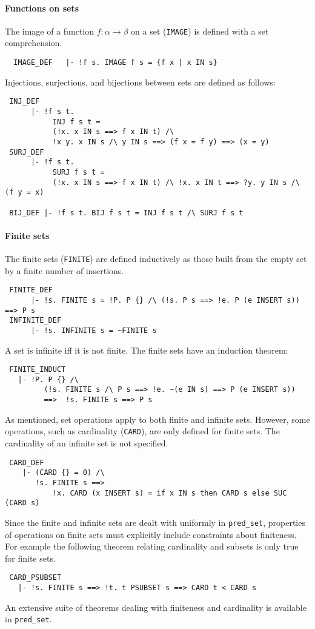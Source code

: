 \paragraph{Functions on sets}
The image of a function $f :\alpha \to \beta$ on
a set ({\small\verb+IMAGE+}) is defined with a set comprehension.
{\small
\begin{verbatim}
  IMAGE_DEF   |- !f s. IMAGE f s = {f x | x IN s}
\end{verbatim}
}
%
Injections, surjections, and bijections between sets are defined
as follows:
%
{\small
\begin{verbatim}
 INJ_DEF
      |- !f s t.
           INJ f s t =
           (!x. x IN s ==> f x IN t) /\
           !x y. x IN s /\ y IN s ==> (f x = f y) ==> (x = y)
 SURJ_DEF
      |- !f s t.
           SURJ f s t =
           (!x. x IN s ==> f x IN t) /\ !x. x IN t ==> ?y. y IN s /\ (f y = x)

 BIJ_DEF |- !f s t. BIJ f s t = INJ f s t /\ SURJ f s t
\end{verbatim}
}
%
\paragraph{Finite sets}
The finite sets ({\small\verb+FINITE+}) are defined inductively as those
built from the empty set by a finite number of insertions.
%
{\small
\begin{verbatim}
 FINITE_DEF
      |- !s. FINITE s = !P. P {} /\ (!s. P s ==> !e. P (e INSERT s)) ==> P s
 INFINITE_DEF
      |- !s. INFINITE s = ~FINITE s
\end{verbatim}
}
%
\noindent
A set is infinite iff it is not finite. The finite sets have an
induction theorem:
%
%
{\small
\begin{verbatim}
 FINITE_INDUCT
   |- !P. P {} /\
         (!s. FINITE s /\ P s ==> !e. ~(e IN s) ==> P (e INSERT s))
         ==>  !s. FINITE s ==> P s
\end{verbatim}
}
%
As mentioned, set operations apply to both finite and infinite
sets. However, some operations, such as cardinality
({\small\verb+CARD+}), are only defined for finite sets.  The
cardinality of an infinite set is not specified.
%
{\small
\begin{verbatim}
 CARD_DEF
    |- (CARD {} = 0) /\
       !s. FINITE s ==>
           !x. CARD (x INSERT s) = if x IN s then CARD s else SUC (CARD s)
\end{verbatim}
}
%
Since the finite and infinite sets are dealt with uniformly in
 {\small\verb+pred_set+}, properties of operations on finite sets must
explicitly include constraints about finiteness. For example the
following theorem relating cardinality and subsets is only true
for finite sets.
%
{\small
\begin{verbatim}
 CARD_PSUBSET
   |- !s. FINITE s ==> !t. t PSUBSET s ==> CARD t < CARD s
\end{verbatim}
}
%
An extensive suite of theorems dealing with finiteness and cardinality
is available in {\small\verb+pred_set+}.

